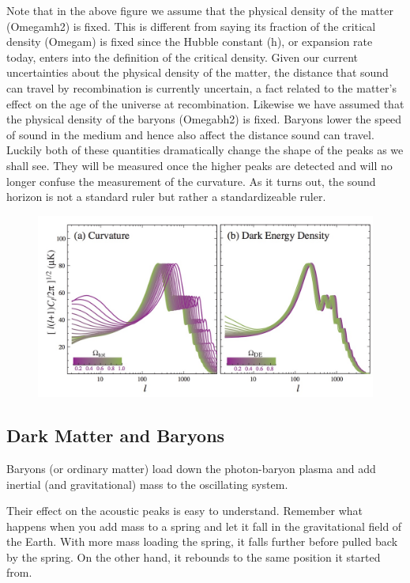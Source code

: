 \documentclass{article}
\begin{document}
Note that in the above figure we assume that the physical density of the matter (Omegamh2) is fixed.  This is different from saying its fraction of the critical density (Omegam) is fixed since the Hubble constant (h), or expansion rate today, enters into the definition of the critical density.  Given our current uncertainties about the physical density of the matter, the distance that sound can travel by recombination is currently uncertain, a fact related to the matter's effect on the age of the universe at recombination.  Likewise we have assumed that the physical density of the baryons  (Omegabh2) is fixed.  Baryons lower the speed of sound in the medium and hence also affect the distance sound can travel.  Luckily both of these quantities dramatically change the shape of the peaks as we shall see.  They will be measured once the higher peaks are detected and will no longer confuse the measurement of the curvature.   As it turns out, the sound horizon is not a standard ruler but rather a standardizeable ruler.
\begin{figure}
\begin{center}
\includegraphics[width=\textwidth]{curvature_de}
\caption{}

\end{center}
\label{DE_curv}
\end{figure}

\subsection{Dark Matter and Baryons}
Baryons (or ordinary matter) load down the photon-baryon plasma and add inertial (and gravitational) mass to the oscillating system.

Their effect on the acoustic peaks is easy to understand.  Remember what happens when you add mass to a spring and let it fall in the gravitational field of the Earth.  With more mass loading the spring, it falls further before pulled back by the spring.  On the other hand, it rebounds to the same position it started from. 
\end{document}
